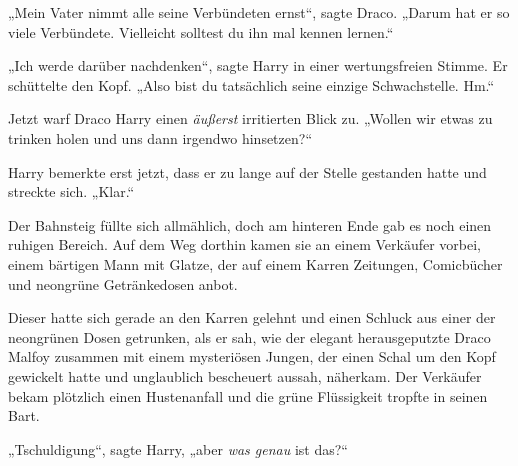 „Mein Vater nimmt alle seine Verbündeten ernst“, sagte Draco. „Darum hat er so viele Verbündete. Vielleicht solltest du ihn mal kennen lernen.“

„Ich werde darüber nachdenken“, sagte Harry in einer wertungsfreien Stimme. Er schüttelte den Kopf. „Also bist du tatsächlich seine einzige Schwachstelle. Hm.“

Jetzt warf Draco Harry einen \emph{äußerst} irritierten Blick zu. „Wollen wir etwas zu trinken holen und uns dann irgendwo hinsetzen?“

Harry bemerkte erst jetzt, dass er zu lange auf der Stelle gestanden hatte und streckte sich. „Klar.“

Der Bahnsteig füllte sich allmählich, doch am hinteren Ende gab es noch einen ruhigen Bereich. Auf dem Weg dorthin kamen sie an einem Verkäufer vorbei, einem bärtigen Mann mit Glatze, der auf einem Karren Zeitungen, Comicbücher und neongrüne Getränkedosen anbot.

Dieser hatte sich gerade an den Karren gelehnt und einen Schluck aus einer der neongrünen Dosen getrunken, als er sah, wie der elegant herausgeputzte Draco Malfoy zusammen mit einem mysteriösen Jungen, der einen Schal um den Kopf gewickelt hatte und unglaublich bescheuert aussah, näherkam. Der Verkäufer bekam plötzlich einen Hustenanfall und die grüne Flüssigkeit tropfte in seinen Bart.

„Tschuldigung“, sagte Harry, „aber \emph{was genau} ist das?“

